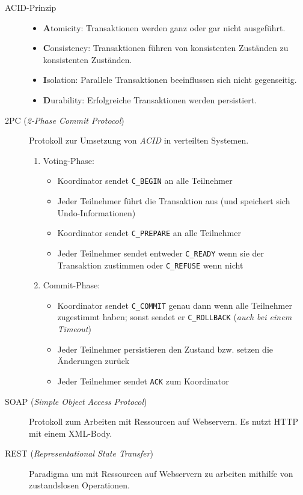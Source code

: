 \documentclass[a4paper]{article}
\begin{document}
\begin{description}
    \item[ACID-Prinzip] \hfill
    \begin{samepage}
    \begin{itemize}
        \item \textbf{A}tomicity: Transaktionen werden ganz oder gar nicht ausgeführt.
        \item \textbf{C}onsistency: Transaktionen führen von konsistenten Zuständen zu konsistenten Zuständen.
        \item \textbf{I}solation: Parallele Transaktionen beeinflussen sich nicht gegenseitig.
        \item \textbf{D}urability: Erfolgreiche Transaktionen werden persistiert.
    \end{itemize}
    \end{samepage}
    \item[2PC (\textit{2-Phase Commit Protocol})]
    \begin{samepage}
    Protokoll zur Umsetzung von \textit{ACID} in verteilten Systemen.
    \begin{enumerate}
        \item Voting-Phase:
        \begin{itemize}
            \item Koordinator sendet \texttt{C\_BEGIN} an alle Teilnehmer
            \item Jeder Teilnehmer führt die Transaktion aus (und speichert sich Undo-Informationen)
            \item Koordinator sendet \texttt{C\_PREPARE} an alle Teilnehmer
            \item Jeder Teilnehmer sendet entweder \texttt{C\_READY} wenn sie der Transaktion zustimmen oder \texttt{C\_REFUSE} wenn nicht
        \end{itemize}
        \item Commit-Phase:
        \begin{itemize}
            \item Koordinator sendet \texttt{C\_COMMIT} genau dann wenn alle Teilnehmer zugestimmt haben; sonst sendet er \texttt{C\_ROLLBACK} (\textit{auch bei einem Timeout})
            \item Jeder Teilnehmer persistieren den Zustand bzw. setzen die Änderungen zurück
            \item Jeder Teilnehmer sendet \texttt{ACK} zum Koordinator
        \end{itemize}
    \end{enumerate}
    \end{samepage}
    \item[SOAP (\textit{Simple Object Access Protocol})] Protokoll zum Arbeiten mit Ressourcen auf Webservern. Es nutzt HTTP mit einem XML-Body.
    \item[REST (\textit{Representational State Transfer})] Paradigma um mit Ressourcen auf Webservern zu arbeiten mithilfe von zustandslosen Operationen.
\end{description}
\end{document}
